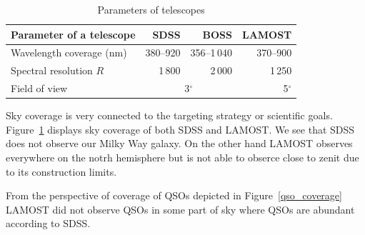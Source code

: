 \begin{table}
\begin{center}
\begin{tabular}{|l|r|r|r|}
	\hline
	Parameter of a telescope & SDSS & BOSS & LAMOST \\
	\hline \hline
	Wavelength coverage (nm) & 380--920 & 356--1\,040 & 370--900 \\ \hline
	Spectral resolution \(R\) & 1\,800 & 2\,000 & 1\,250 \\ \hline
	Field of view & \multicolumn{2}{|c|}{3\(^{\circ}\)} & 5\(^{\circ}\) \\ \hline
\end{tabular}
\end{center}
\caption{Parameters of telescopes}
\label{telescopes_parameters}
\end{table}

Sky coverage is very connected to the targeting strategy or scientific goals.
Figure~\ref{sky_coverage} displays sky coverage of both SDSS and LAMOST.
We see that SDSS does not observe our Milky Way galaxy.
On the other hand LAMOST observes everywhere on the notrh hemisphere
but is not able to obserce close to zenit due to its construction limits.

From the perspective of coverage of QSOs depicted in Figure~\ref{qso_coverage}
LAMOST did not observe QSOs in some part of sky
where QSOs are abundant according to SDSS.

\begin{figure}
\begin{center}
\\
\end{center}
\caption[Sky coverage of SDSS and LAMOST]{}
\label{sky_coverage}
\end{figure}

